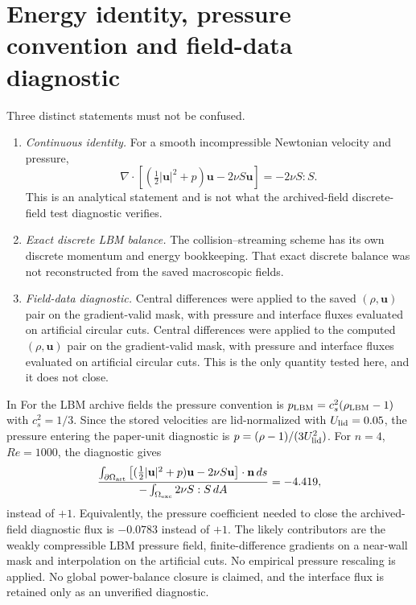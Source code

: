 \documentclass[11pt]{article}
\begin{document}
\section{Energy identity, pressure convention and field-data diagnostic}
\label{sec:energy}

Three distinct statements must not be confused.

\begin{enumerate}
  \item \emph{Continuous identity.} For a smooth incompressible Newtonian
        velocity and pressure,
        \[
          \nabla\cdot\left[\left(\tfrac12|\mathbf{u}|^2+p\right)\mathbf{u}
          -2\nu S\mathbf{u}\right]=-2\nu S:S .
        \]
        This is an analytical statement and is not what the \color{revred}archived-field \color{revblue}discrete-field\color{black} \color{revred}test \color{revblue}diagnostic\color{black}
        verifies.
  \item \emph{Exact discrete LBM balance.} The collision--streaming scheme has
        its own discrete momentum and energy bookkeeping. That exact discrete
        balance was not reconstructed from the saved macroscopic fields.
    \item \emph{Field-data diagnostic.} \color{revred}Central differences were applied to the saved $(\rho,\mathbf{u})$ pair on the gradient-valid mask, with pressure and interface fluxes evaluated on artificial circular cuts. \color{revblue}Central differences were applied to the computed $(\rho,\mathbf{u})$ pair on the gradient-valid mask, with pressure and interface fluxes evaluated on artificial circular cuts. \color{black}This is the only quantity tested here, and it does not close.
\end{enumerate}

\color{revred}In \color{revblue}For\color{black} the LBM \color{revred}archive \color{revblue}fields\color{black} the pressure convention is
$p_{\rm LBM}=c_s^2(\rho_{\rm LBM}-1)$ with $c_s^2=1/3$. Since the stored
velocities are lid-normalized with $U_{\rm lid}=0.05$, the pressure entering
the paper-unit diagnostic is
$p=(\rho-1)/(3U_{\rm lid}^2)$. For $n=4$, $Re=1000$, the diagnostic gives
\begin{equation}
  \frac{\int_{\partial\Omega_{\rm art}}
        \left[(\tfrac12|\mathbf{u}|^2+p)\mathbf{u}-2\nu S\mathbf{u}\right]\cdot\mathbf{n}\,ds}
       {-\int_{\Omega_{\rm exc}}2\nu S:S\,dA}
  =-4.419 ,
  \label{eq:flux_ratio}
\end{equation}
instead of $+1$. Equivalently, the pressure coefficient needed to close the
\color{revred}archived-field \color{revblue}diagnostic\color{black} flux is $-0.0783$ instead of $+1$. The likely contributors are
the weakly compressible LBM pressure field, finite-difference gradients on a
near-wall mask and interpolation on the artificial cuts. No empirical pressure
rescaling is applied. No global power-balance closure is claimed, and the
interface flux is retained only as an unverified diagnostic.
\end{document}
